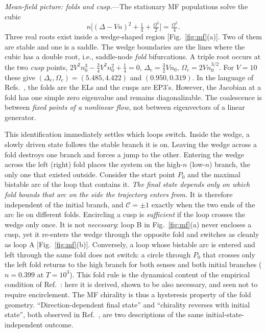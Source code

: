 \documentclass[aps,prl,twocolumn,superscriptaddress,amsmath,amssymb,reprint]{revtex4-2}
\newcommand{\Cc}{\mathcal{C}}
\begin{document}
\emph{Mean-field picture: folds and cusp.}---The stationary MF populations solve the cubic
\begin{equation}
n\big[(\Delta-Vn)^2+\tfrac14+\tfrac{\Omega^2}{2}\big]=\tfrac{\Omega^2}{4}.
\label{eq:cubic}
\end{equation}
Three real roots exist inside a wedge-shaped region [Fig.~\ref{fig:mf}(a)]. Two of them are stable and one is a saddle. The wedge boundaries are the lines where the cubic has a double root, i.e., saddle-node \emph{fold} bifurcations. A triple root occurs at the two \emph{cusp} points, $2V^2n_0^3-\frac34V^2n_0^2+\frac14=0$, $\Delta_c=\frac32Vn_0$, $\Omega_c=2Vn_0^{3/2}$. For $V=10$ these give $(\Delta_c,\Omega_c)=(5.485,4.422)$ and $(0.950,0.319)$. In the language of Refs.~\cite{Xie2025,SunYi2024}, the folds are the ELs and the cusps are EP3's. However, the Jacobian at a fold has one simple zero eigenvalue and remains diagonalizable. The coalescence is between \emph{fixed points of a nonlinear flow}, not between eigenvectors of a linear generator.

This identification immediately settles which loops switch. Inside the wedge, a slowly driven state follows the stable branch it is on. Leaving the wedge across a fold destroys one branch and forces a jump to the other. Entering the wedge across the left (right) fold places the system on the high-$n$ (low-$n$) branch, the only one that existed outside. Consider the start point $P_0$ and the maximal bistable arc of the loop that contains it. \emph{The final state depends only on which fold bounds that arc on the side the trajectory enters from.} It is therefore independent of the initial branch, and $\Cc=\pm1$ exactly when the two ends of the arc lie on different folds. Encircling a cusp is \emph{sufficient} if the loop crosses the wedge only once. It is not \emph{necessary}: loop B in Fig.~\ref{fig:mf}(a) never encloses a cusp, yet it re-enters the wedge through the opposite fold and switches as cleanly as loop A [Fig.~\ref{fig:mf}(b)]. Conversely, a loop whose bistable arc is entered and left through the same fold does not switch: a circle through $P_0$ that crosses only the left fold returns to the high branch for both senses and both initial branches ($n=0.399$ at $T=10^3$). This fold rule is the dynamical content of the empirical condition of Ref.~\cite{Xie2025}: here it is derived, shown to be also necessary, and seen not to require encirclement. The MF chirality is thus a hysteresis property of the fold geometry. ``Direction-dependent final state'' and ``chirality reverses with initial state'', both observed in Ref.~\cite{Xie2025}, are two descriptions of the same initial-state-independent outcome.
\end{document}
